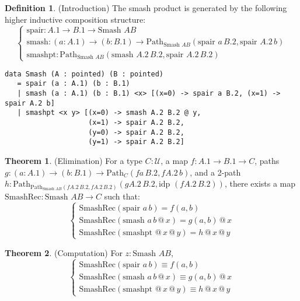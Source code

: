 \documentclass{article}
\theoremstyle{definition}
\newtheorem{theorem}{Theorem}
\newtheorem{definition}{Definition}
\begin{document}
\begin{definition} (Introduction)
The smash product is generated by the following higher inductive composition structure:
\[
\begin{cases}
\text{spair} : A.1 \to B.1 \to \text{Smash } A B \\
\text{smash} : (a : A.1) \to (b : B.1) \to \text{Path}_{\text{Smash } A B} (\text{spair } a \, B.2, \text{spair } A.2 \, b) \\
\text{smashpt} : \text{Path}_{\text{Smash } A B} (\text{smash } A.2 \, B.2, \text{spair } A.2 \, B.2)
\end{cases}
\]
\begin{lstlisting}
data Smash (A : pointed) (B : pointed)
   = spair (a : A.1) (b : B.1)
   | smash (a : A.1) (b : B.1) <x> [(x=0) -> spair a B.2, (x=1) -> spair A.2 b]
   | smashpt <x y> [(x=0) -> smash A.2 B.2 @ y,
                    (x=1) -> spair A.2 B.2,
                    (y=0) -> spair A.2 B.2,
                    (y=1) -> spair A.2 B.2]
\end{lstlisting}
\end{definition}

\begin{theorem} (Elimination)
For a type $C : \mathcal{U}$, a map $f : A.1 \to B.1 \to C$, paths $g : (a : A.1) \to (b : B.1) \to \text{Path}_C (f a \, B.2, f A.2 \, b)$, and a 2-path $h : \text{Path}_{\text{Path}_{\text{Smash } A B} (f A.2 \, B.2, f A.2 \, B.2)} (g A.2 \, B.2, \text{idp } (f A.2 \, B.2))$, there exists a map $\text{SmashRec} : \text{Smash } A B \to C$ such that:
\[
\begin{cases}
\text{SmashRec}(\text{spair } a \, b) = f(a, b) \\
\text{SmashRec}(\text{smash } a \, b \, @ \, x) = g(a, b) \, @ \, x \\
\text{SmashRec}(\text{smashpt } @ \, x \, @ \, y) = h \, @ \, x \, @ \, y
\end{cases}
\]
\end{theorem}

\begin{theorem} (Computation)
For $z : \text{Smash } A B$,
\[
\begin{cases}
\text{SmashRec}(\text{spair } a \, b) \equiv f(a, b) \\
\text{SmashRec}(\text{smash } a \, b \, @ \, x) \equiv g(a, b) \, @ \, x \\
\text{SmashRec}(\text{smashpt } @ \, x \, @ \, y) \equiv h \, @ \, x \, @ \, y
\end{cases}
\]
\end{theorem}
\end{document}
